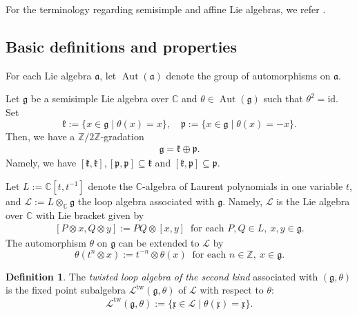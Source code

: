 \documentclass[12pt,a4paper]{amsart}
\theoremstyle{definition}
\newtheorem{defi}[thm]{Definition}
\newtheorem{rem}[thm]{Remark}
\numberwithin{equation}{subsection}
\begin{document}
For the terminology regarding semisimple and affine Lie algebras, we refer \cite{Kac83}.


\subsection{Basic definitions and properties}
For each Lie algebra $\mathfrak{a}$, let $\operatorname{Aut}(\mathfrak{a})$ denote the group of automorphisms on $\mathfrak{a}$.

Let $\mathfrak{g}$ be a semisimple Lie algebra over $\mathbb{C}$ and $\theta \in \operatorname{Aut}(\mathfrak{g})$ such that $\theta^2 = \mathrm{id}$.
Set
\[
  \mathfrak{k} := \{ x \in \mathfrak{g} \mid \theta(x) = x \}, \quad \mathfrak{p} := \{ x \in \mathfrak{g} \mid \theta(x) = -x \}.
\]
Then, we have a $\mathbb{Z}/2\mathbb{Z}$-gradation
\begin{align}\label{eq: Z2_grad_g}
  \mathfrak{g} = \mathfrak{k} \oplus \mathfrak{p}.
\end{align}
Namely, we have $[\mathfrak{k}, \mathfrak{k}], [\mathfrak{p},\mathfrak{p}] \subseteq \mathfrak{k}$ and $[\mathfrak{k},\mathfrak{p}] \subseteq \mathfrak{p}$.

Let $L := \mathbb{C}[t,t^{-1}]$ denote the $\mathbb{C}$-algebra of Laurent polynomials in one variable $t$, and $\mathcal{L} := L \otimes_\mathbb{C} \mathfrak{g}$ the loop algebra associated with $\mathfrak{g}$.
Namely, $\mathcal{L}$ is the Lie algebra over $\mathbb{C}$ with Lie bracket given by
\begin{align*}\label{eq: Lie bracket for loop alg}
  [P \otimes x, Q \otimes y] := PQ \otimes [x,y] \ \text{ for each } P,Q \in L,\ x,y \in \mathfrak{g}.
\end{align*}
The automorphism $\theta$ on $\mathfrak{g}$ can be extended to $\mathcal{L}$ by
\[
  \theta(t^n \otimes x) := t^{-n} \otimes \theta(x) \ \text{ for each } n \in \mathbb{Z},\ x \in \mathfrak{g}.
\]

\begin{defi}
  The \emph{twisted loop algebra of the second kind} associated with $(\mathfrak{g}, \theta)$ is the fixed point subalgebra $\mathcal{L}^{\mathrm{tw}}(\mathfrak{g},\theta)$ of $\mathcal{L}$ with respect to $\theta$:
  \[
    \mathcal{L}^{\mathrm{tw}}(\mathfrak{g},\theta) := \{ \mathfrak{x} \in \mathcal{L} \mid \theta(\mathfrak{x}) = \mathfrak{x} \}.
  \]
\end{defi}

\end{document}

